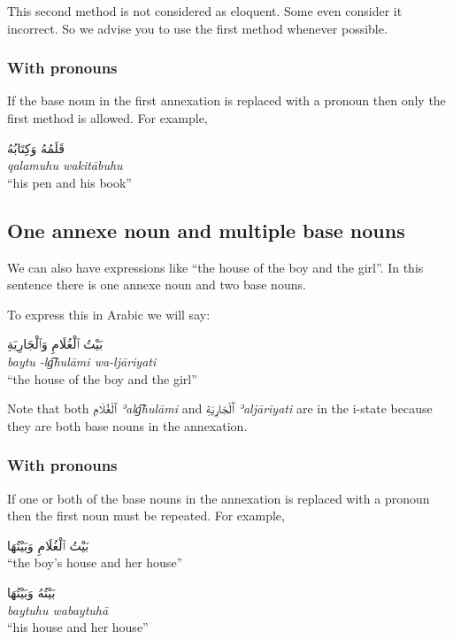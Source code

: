 \documentclass[
  10pt,
]{book}
\begin{document}
This second method is not considered as eloquent. Some even consider it incorrect. So we advise you to use the first method whenever possible.

\subsubsection{With pronouns}\label{with-pronouns}

If the base noun in the first annexation is replaced with a pronoun then only the first method is allowed. For example,

\foreignlanguage{arabic}{قَلَمُهُ وَکِتَابُهُ}\\
\emph{qalamuhu wakitābuhu}\\
\enquote{his pen and his book}

\subsection{One annexe noun and multiple base nouns}\label{one-annexe-noun-and-multiple-base-nouns}

We can also have expressions like \enquote{the house of the boy and the girl}. In this sentence there is one annexe noun and two base nouns.

To express this in Arabic we will say:

\foreignlanguage{arabic}{بَيْتُ ٱلْغُلَامِ وَٱلْجَارِيَةِ}\\
\emph{baytu -lg͡hulāmi wa-ljāriyati}\\
\enquote{the house of the boy and the girl}

Note that both
\foreignlanguage{arabic}{ٱلْغُلَامِ} \emph{ʾalg͡hulāmi} and \foreignlanguage{arabic}{ٱَلْجَارِيَةِ} \emph{ʾaljāriyati} are in the i-state because they are both base nouns in the annexation.

\subsubsection{With pronouns}\label{with-pronouns-1}

If one or both of the base nouns in the annexation is replaced with a pronoun then the first noun must be repeated. For example,

\foreignlanguage{arabic}{بَيْتُ ٱلْغُلَامِ وَبَيْتُهَا}\\
\enquote{the boy's house and her house}

\foreignlanguage{arabic}{بَيْتُهُ وَبَيْتُهَا}\\
\emph{baytuhu wabaytuhā}\\
\enquote{his house and her house}
\end{document}
